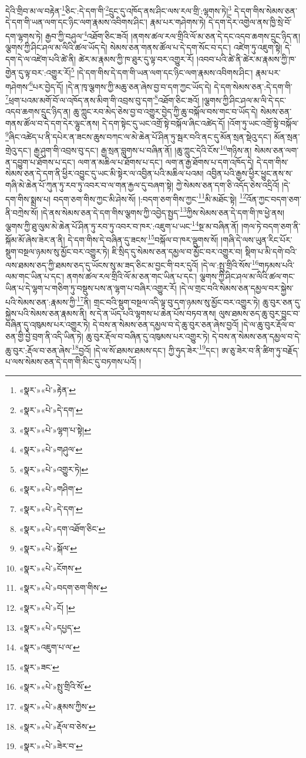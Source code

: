 དེའི་གྲིབ་མ་ལ་བརྟེན་\footnote{«སྣར་»«པེ་»རྟེན་}ཅིང་:དེ་དག་གི་\footnote{«སྣར་»«པེ་»དེ་དག་}དྲུང་དུ་འཁོད་ནས་ཤིང་ལས་རལ་གྲི་:ལྷགས་ཏེ།\footnote{«སྣར་»«པེ་»ལྷག་པ་སྟེ།} དེ་དག་གིས་སེམས་ཅན་དེ་དག་གི་ཡན་ལག་དང་ཉིང་ལག་རྣམས་འབིགས་ཤིང་། རྣམ་པར་གཤེགས་ཏེ། དེ་དག་དེར་འགྱེལ་ནས་ཁྱི་སྲེ་བོ་དག་ལྷགས་ཏེ། རྒྱབ་ཀྱི་བཤུལ་\footnote{«སྣར་»«པེ་»གཤུལ་}འཐོག་ཅིང་ཟའོ། །ནགས་ཚལ་རལ་གྲིའི་ལོ་མ་ཅན་དེ་དང་འདབ་ཆགས་དྲུང་ཉིད་ན། ལྕགས་ཀྱི་ཤིང་ཤལ་མ་ལིའི་ཚལ་ཡོད་དེ། སེམས་ཅན་གནས་ཚོལ་པ་དེ་དག་སོང་བ་དང་། འཛེག་ཏུ་འཇུག་སྟེ། དེ་དག་དེ་ལ་འཛེག་པའི་ཚེ་ནི། ཚེར་མ་རྣམས་ཀྱི་ཁ་ཐུར་དུ་ལྟ་བར་འགྱུར་རོ། །འབབ་པའི་ཚེ་ནི་ཚེར་མ་རྣམས་ཀྱི་ཁ་གྱེན་དུ་ལྟ་བར་:འགྱུར་རོ།\footnote{«སྣར་»«པེ་»འགྱུར་ཏེ།} །དེ་དག་གིས་དེ་དག་གི་ཡན་ལག་དང་ཉིང་ལག་རྣམས་འབིགས་ཤིང་། རྣམ་པར་གཤེགས་\footnote{«སྣར་»«པེ་»གཤིག་}པར་བྱེད་དོ། །དེ་ན་ཁྭ་ལྕགས་ཀྱི་མཆུ་ཅན་ཞེས་བྱ་བ་དག་ཀྱང་ཡོད་དེ། དེ་དག་སེམས་ཅན་:དེ་དག་གི་\footnote{«སྣར་»«པེ་»དེ་དག་}ཕྲག་པའམ་མགོ་བོ་ལ་འཁོད་ནས་མིག་གི་འབྲས་བུ་དག་\footnote{«སྣར་»«པེ་»དག་འཐོག་ཅིང་}འཐོག་ཅིང་ཟའོ། །ལྕགས་ཀྱི་ཤིང་ཤལ་མ་ལི་དེ་དང་འདབ་ཆགས་དྲུང་ཉིད་ན། ཆུ་ཀླུང་རབ་མེད་ཅེས་བྱ་བ་འགྱུར་བྱེད་ཀྱི་ཆུ་བསྐོལ་བས་གང་བ་ཡོད་དེ། སེམས་ཅན་གནས་ཚོལ་བ་དེ་དག་དེར་ལྷུང་ནས། དེ་དག་སྟེང་དུ་ཡང་འགྲོ་སྟེ་བསྐོལ་ཞིང་འཚེད་དོ། །འོག་ཏུ་ཡང་འགྲོ་སྟེ་བསྐོལ་\footnote{«སྣར་»«པེ་»སྐོལ་}ཞིང་འཚེད་པ་ནི་དཔེར་ན་ཟངས་ཆུས་བཀང་ལ་མེ་ཆེན་པོ་ཤིན་ཏུ་སྦར་བའི་ནང་དུ་མོན་སྲན་སྡེའུ་དང་། མོན་སྲན་གྲེའུ་དང་། རྒྱ་ཤུག་གི་འབྲས་བུ་དང་། རྒྱ་སྲན་བླུགས་པ་བཞིན་ནོ། །ཆུ་ཀླུང་དེའི་ངོས་\footnote{«སྣར་»«པེ་»ངོགས་}གཉིས་ན། སེམས་ཅན་ལག་ན་དབྱུག་པ་ཐོགས་པ་དང་། ལག་ན་མཆིལ་པ་ཐོགས་པ་དང་། ལག་ན་རྒྱ་ཐོགས་པ་དག་འཁོད་དེ། དེ་དག་གིས་སེམས་ཅན་དེ་དག་ནི་ཕྱིར་འབྱུང་དུ་ཡང་མི་སྟེར་ལ་འབྱིན་པའི་མཆིལ་པའམ། འབྱིན་པའི་རྒྱས་ཕྱིར་ཕྱུང་ནས་ས་གཞི་མེ་ཆེན་པོ་ཀུན་ཏུ་རབ་ཏུ་འབར་བ་ལ་གན་རྐྱལ་དུ་བཞག་སྟེ། ཀྱེ་སེམས་ཅན་དག་ཅི་འདོད་ཅེས་འདྲིའོ། །དེ་དག་གིས་སྨྲས་པ། བདག་ཅག་གིས་ཀྱང་མི་ཤེས་སོ། །:བདག་ཅག་གིས་ཀྱང་\footnote{«སྣར་»«པེ་»བདག་ཅག་གིས་}མི་མཐོང་སྟེ། \footnote{«སྣར་»«པེ་»ངོ། ། }འོན་ཀྱང་བདག་ཅག་ནི་བཀྲེས་སོ། །དེ་ནས་སེམས་ཅན་དེ་དག་གིས་ལྕགས་ཀྱི་འབྱེད་སྤྱད་\footnote{«སྣར་»«པེ་»དཔྱད་}ཀྱིས་སེམས་ཅན་དེ་དག་གི་ཁ་ཕྱེ་ནས། ལྕགས་ཀྱི་ཐུ་ལུམ་མེ་ཆེན་པོ་ཤིན་ཏུ་རབ་ཏུ་འབར་བ་ཁར་:འཇུག་པ་ཡང་\footnote{«སྣར་»འཇུག་པ་ལ་}སྔ་མ་བཞིན་ནོ། །གལ་ཏེ་བདག་ཅག་ནི་སྐོམ་མོ་ཞེས་ཟེར་ན་ནི། དེ་དག་གིས་དེ་བཞིན་དུ་ཟངས་\footnote{«སྣར་»ཟང་}བསྐོལ་བ་ཁར་ལྡུགས་སོ། །གཞི་དེ་ལས་ཡུན་རིང་པོར་སྡུག་བསྔལ་ཉམས་སུ་མྱོང་བར་འགྱུར་ཏེ། ཇི་སྲིད་དུ་སེམས་ཅན་དམྱལ་བ་མྱོང་བར་འགྱུར་བ། སྡིག་པ་མི་དགེ་བའི་ལས་ཐམས་ཅད་ཀྱི་ཐམས་ཅད་དུ་ཡོངས་སུ་མ་ཟད་ཅིང་མ་བྱང་གི་བར་དུའོ། །དེ་ལ་:སྤུ་གྲིའི་སོས་\footnote{«སྣར་»«པེ་»སྤུ་གྲིའི་སོ་}གཏམས་པའི་ལམ་གང་ཡིན་པ་དང་། ནགས་ཚལ་རལ་གྲིའི་ལོ་མ་ཅན་གང་ཡིན་པ་དང་། ལྕགས་ཀྱི་ཤིང་ཤལ་མ་ལིའི་ཚལ་གང་ཡིན་པ་དེ་ལྷག་པ་གཅིག་ཏུ་བསྡུས་པས་ན་ལྷག་པ་བཞིར་འགྱུར་རོ། །དེ་ལ་གྲང་བའི་སེམས་ཅན་དམྱལ་བར་སྐྱེས་པའི་སེམས་ཅན་:རྣམས་ཀྱི་\footnote{«སྣར་»«པེ་»རྣམས་ཀྱིས་}ནི། གྲང་བའི་སྡུག་བསྔལ་འདི་ལྟ་བུ་དག་ཉམས་སུ་མྱོང་བར་འགྱུར་ཏེ། ཆུ་བུར་ཅན་དུ་སྐྱེས་པའི་སེམས་ཅན་རྣམས་ནི། ས་དེ་ན་ཡོད་པའི་ལྷགས་པ་ཆེན་པོས་བཏབ་ནས། ལུས་ཐམས་ཅད་ཆུ་བུར་བྱུང་བ་བཞིན་དུ་འཁུམས་པར་འགྱུར་ཏེ། དེ་བས་ན་སེམས་ཅན་དམྱལ་བ་དེ་ཆུ་བུར་ཅན་ཞེས་བྱའོ། །དེ་ལ་ཆུ་བུར་རྡོལ་བ་ཅན་གྱི་བྱེ་བྲག་ནི་འདི་ཡིན་ཏེ། ཆུ་བུར་རྡོལ་བ་བཞིན་དུ་འཁུམས་པར་འགྱུར་ཏེ། དེ་བས་ན་སེམས་ཅན་དམྱལ་བ་དེ་ཆུ་བུར་:རྡོལ་བ་ཅན་ཞེས་\footnote{«སྣར་»«པེ་»རྡོལ་བ་ཅེས་}བྱའོ། །དེ་ལ་སོ་ཐམས་ཐམས་དང་། ཀྱི་ཧུད་ཟེར་\footnote{«སྣར་»«པེ་»ཟེར་བ་}དང་། ཨ་ཅུ་ཟེར་བ་ནི་ཚིག་ཏུ་བརྗོད་པ་ལས་སེམས་ཅན་དེ་དག་གི་མིང་དུ་བཏགས་པའོ། །
